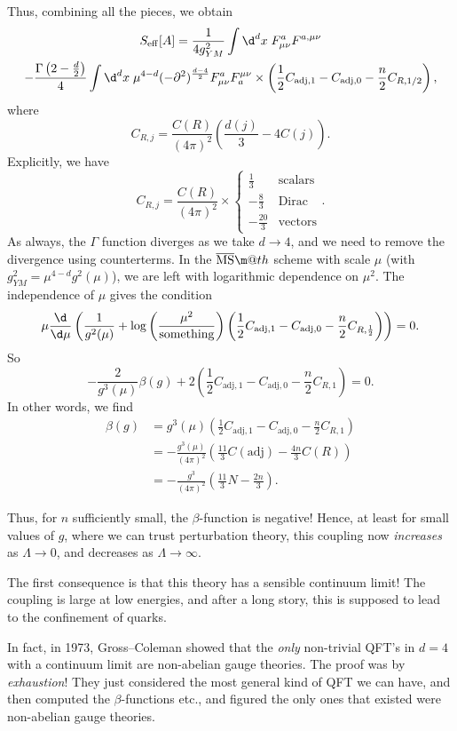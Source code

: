 \documentclass[a4paper]{article}
\makeatletter
\newcommand*{\textoverline}[1]{$\overline{\hbox{#1}}\m@th$}
\makeatother
\begin{document}
Thus, combining all the pieces, we obtain %
\begin{multline*}
  S_{\mathrm{eff}}[A] = \frac{1}{4 g_{YM}^2}\int \d^d x\; F_{\mu\nu}^a F^{a, \mu\nu} \\
  - \frac{\Gamma\left(2 - \frac{d}{2}\right)}{4} \int\d^d x\; \mu^{4 - d}(-\partial^2)^{\frac{d - 4}{2}} F_{\mu\nu}^a F^{\mu\nu}_a \times \left(\frac{1}{2} C_{\mathrm{adj}, 1} - C_{\mathrm{adj}, 0} - \frac{n}{2} C_{R, 1/2}\right),
\end{multline*}
where
\[
  C_{R, j} = \frac{C(R)}{(4\pi)^2} \left(\frac{d(j)}{3} - 4 C(j)\right).
\]
Explicitly, we have
\[
  C_{R, j} = \frac{C(R)}{(4\pi)^2} \times
  \begin{cases}
    \frac{1}{3} & \mathrm{scalars}\\
    -\frac{8}{3} & \mathrm{Dirac}\\
    -\frac{20}{3} & \mathrm{vectors}
  \end{cases}.
\]
As always, the $\Gamma$ function diverges as we take $d \to 4$, and we need to remove the divergence using counterterms. In the \textoverline{MS} scheme with scale $\mu$ (with $g_{YM}^2 = \mu^{4 - d} g^2(\mu)$), we are left with logarithmic dependence on $\mu^2$. The independence of $\mu$ gives the condition
\[
  \mu\frac{\d}{\d \mu}\left(\frac{1}{g^2(\mu)} + \log \left(\frac{\mu^2}{\text{something}}\right)\left(\frac{1}{2} C_{\mathrm{adj}, 1} - C_{\mathrm{adj}, 0} - \frac{n}{2} C_{R, \frac{1}{2}}\right)\right) = 0.
\]
So
\[
  -\frac{2}{g^3(\mu)} \beta(g) + 2\left(\frac{1}{2} C_{\mathrm{adj}, 1} - C_{\mathrm{adj}, 0} - \frac{n}{2} C_{R, 1}\right) = 0.
\]
In other words, we find
\begin{align*}
  \beta(g) &= g^3(\mu) \left(\frac{1}{2} C_{\mathrm{adj}, 1} - C_{\mathrm{adj}, 0} - \frac{n}{2} C_{R, 1}\right)\\
  &= - \frac{g^3(\mu)}{(4\pi)^2} \left(\frac{11}{3} C(\mathrm{adj}) - \frac{4n}{3} C(R)\right)\\
  &= - \frac{g^3}{(4\pi)^2} \left(\frac{11}{3} N - \frac{2n}{3}\right).
\end{align*}

Thus, for $n$ sufficiently small, the $\beta$-function is negative! Hence, at least for small values of $g$, where we can trust perturbation theory, this coupling now \emph{increases} as $\Lambda \to 0$, and decreases as $\Lambda \to \infty$.

The first consequence is that this theory has a sensible continuum limit! The coupling is large at low energies, and after a long story, this is supposed to lead to the confinement of quarks.

In fact, in 1973, Gross--Coleman showed that the \emph{only} non-trivial QFT's in $d = 4$ with a continuum limit are non-abelian gauge theories. The proof was by \emph{exhaustion}! They just considered the most general kind of QFT we can have, and then computed the $\beta$-functions etc., and figured the only ones that existed were non-abelian gauge theories.


\printindex
\end{document}
